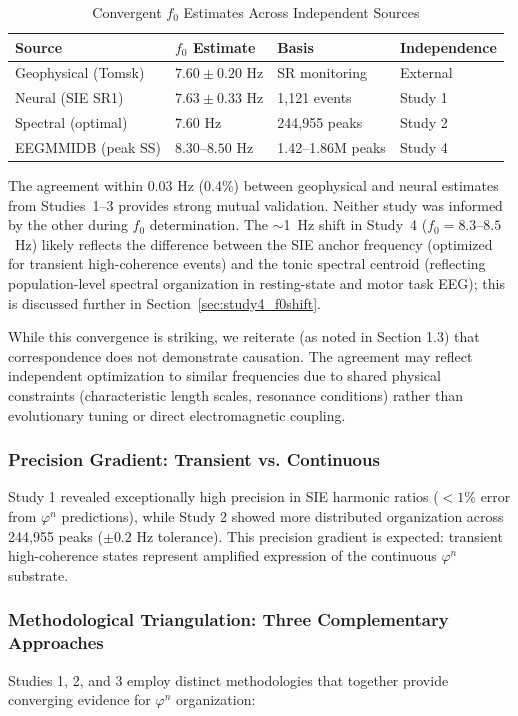 \documentclass[11pt,a4paper]{article}
\newcommand{\phisym}{\varphi}
\begin{document}
\begin{table}[H]
\centering
\caption{Convergent $f_0$ Estimates Across Independent Sources}
\label{tab:f0_convergence}
\begin{tabular}{@{}llll@{}}
\toprule
Source & $f_0$ Estimate & Basis & Independence \\
\midrule
Geophysical (Tomsk) & $7.60 \pm 0.20$ Hz & SR monitoring & External \\
Neural (SIE SR1) & $7.63 \pm 0.33$ Hz & 1,121 events & Study 1 \\
Spectral (optimal) & $7.60$ Hz & 244,955 peaks & Study 2 \\
EEGMMIDB (peak SS) & $8.30$--$8.50$ Hz & 1.42--1.86M peaks & Study 4 \\
\bottomrule
\end{tabular}
\end{table}

The agreement within 0.03 Hz (0.4\%) between geophysical and neural estimates from Studies~1--3 provides strong mutual validation. Neither study was informed by the other during $f_0$ determination. The $\sim$1~Hz shift in Study~4 ($f_0 = 8.3$--$8.5$~Hz) likely reflects the difference between the SIE anchor frequency (optimized for transient high-coherence events) and the tonic spectral centroid (reflecting population-level spectral organization in resting-state and motor task EEG); this is discussed further in Section~\ref{sec:study4_f0shift}.

While this convergence is striking, we reiterate (as noted in Section 1.3) that correspondence does not demonstrate causation. The agreement may reflect independent optimization to similar frequencies due to shared physical constraints (characteristic length scales, resonance conditions) rather than evolutionary tuning or direct electromagnetic coupling.

\subsubsection{Precision Gradient: Transient vs. Continuous}
Study 1 revealed exceptionally high precision in SIE harmonic ratios ($<1\%$ error from $\phisym^n$ predictions), while Study 2 showed more distributed organization across 244,955 peaks ($\pm 0.2$ Hz tolerance). This precision gradient is expected: transient high-coherence states represent amplified expression of the continuous $\phisym^n$ substrate.

\subsubsection{Methodological Triangulation: Three Complementary Approaches}
Studies 1, 2, and 3 employ distinct methodologies that together provide converging evidence for $\phisym^n$ organization:
\end{document}
